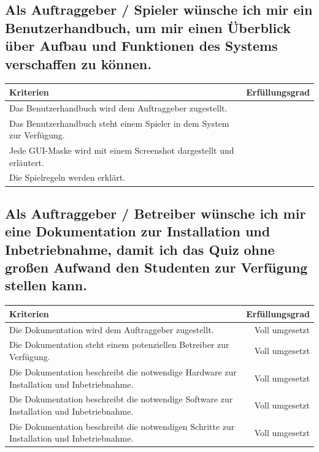 \documentclass[a4paper,11pt,listof=numbered,glossary=totoc,parskip=half,toc=bib]{scrreprt}
\begin{document}
\begin{appendices}
\begin{tabularx}{\textwidth}{Xr}
			\bottomrule
		\end{tabularx}	
				
		\subsection{Als Auftraggeber / Spieler wünsche ich mir ein Benutzerhandbuch, um mir einen Überblick über
Aufbau und Funktionen des Systems verschaffen zu können.}
		\begin{tabularx}{\textwidth}{Xr}
			
			Kriterien & Erfüllungsgrad \\
			\midrule
		Das Benutzerhandbuch wird dem Auftraggeber zugestellt. & \\
		Das Benutzerhandbuch steht einem Spieler in dem System zur Verfügung. & \\
		Jede GUI-Maske wird mit einem Screenshot dargestellt und erläutert. & \\
		Die Spielregeln werden erklärt. & \\
			\bottomrule
		\end{tabularx}	
		
		\subsection{Als Auftraggeber / Betreiber wünsche ich mir eine Dokumentation zur Installation und
Inbetriebnahme, damit ich das Quiz ohne großen Aufwand den Studenten zur Verfügung stellen
kann.}
		\begin{tabularx}{\textwidth}{Xr}
			
			Kriterien & Erfüllungsgrad \\
			\midrule
		Die Dokumentation wird dem Auftraggeber zugestellt. & Voll umgesetzt \\
		Die Dokumentation steht einem potenziellen Betreiber zur Verfügung. & Voll umgesetzt \\
		Die Dokumentation beschreibt die notwendige Hardware zur Installation und Inbetriebnahme. & Voll umgesetzt \\
		Die Dokumentation beschreibt die notwendige Software zur Installation und Inbetriebnahme. & Voll umgesetzt \\
		Die Dokumentation beschreibt die notwendigen Schritte zur Installation und Inbetriebnahme. & Voll umgesetzt \\
		
			\bottomrule
		\end{tabularx}	

		
			

\end{appendices}
\end{document}
